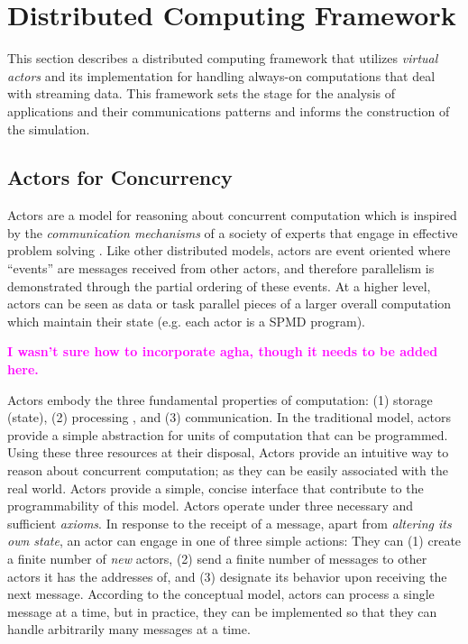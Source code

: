 \documentclass[conference,twocolumn,11pt]{IEEEtran}
\newcommand{\bennote}[1]{\textcolor{magenta}{\bf #1}}
\begin{document}
\section{Distributed Computing Framework}

This section describes a distributed computing framework that utilizes \textit{virtual actors} and its implementation for handling always-on computations that deal with streaming data. This framework sets the stage for the analysis of applications and their communications patterns and informs the construction of the simulation.

\subsection{Actors for Concurrency}

Actors are a model for reasoning about concurrent computation which is inspired by the \textit{communication mechanisms} of a society of experts that engage in effective problem solving \cite{hewitt_viewing_1977}.  Like other distributed models, actors are event oriented where ``events'' are messages received from other actors, and therefore parallelism is demonstrated through the partial ordering of these events. At a higher level, actors can be seen as data or task parallel pieces of a larger overall computation which maintain their state (e.g. each actor is a SPMD program).

\bennote{I wasn't sure how to incorporate agha, though it needs to be added here.}

Actors embody the three fundamental properties of computation: (1) storage (state), (2) processing , and (3) communication. In the traditional model, actors provide a simple abstraction for units of computation that can be programmed. Using these three resources at their disposal, Actors provide an intuitive way to reason about concurrent computation; as they can be easily associated with the real world. Actors provide a simple, concise interface that contribute to the programmability of this model. Actors operate under three necessary and sufficient \textit{axioms}. In response to the receipt of a message, apart from \textit{altering its own state}, an actor can engage in one of three simple actions: They can (1) create a finite number of \textit{new} actors, (2) send a finite number of messages to other actors it has the addresses of, and (3) designate its behavior upon receiving the next message. According to the conceptual model, actors can process a single message at a time, but in practice, they can be implemented so that they can handle arbitrarily many messages at a time. %
\end{document}
